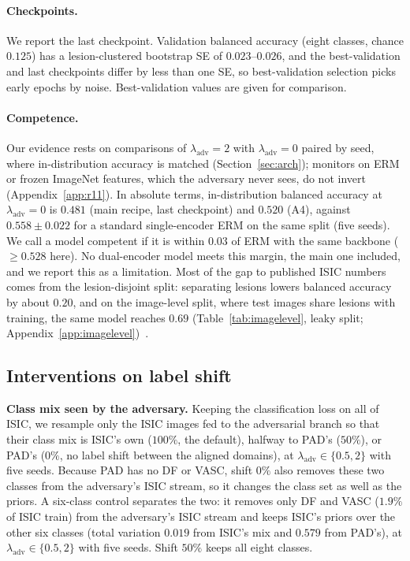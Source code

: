 \documentclass{midl}
\newcommand{\lam}{\lambda_{\mathrm{adv}}}
\begin{document}
\paragraph{Checkpoints.} We report the last checkpoint. Validation balanced accuracy (eight
classes, chance $0.125$) has a lesion-clustered bootstrap SE of $0.023$--$0.026$, and the
best-validation and last checkpoints differ by less than one SE, so best-validation selection
picks early epochs by noise. Best-validation values are given for comparison.

\paragraph{Competence.} Our evidence rests on comparisons of $\lam=2$ with $\lam=0$ paired by seed, where
in-distribution accuracy is matched (Section~\ref{sec:arch}); monitors on ERM or frozen ImageNet features, which
the adversary never sees, do not invert (Appendix~\ref{app:r11}). In absolute terms, in-distribution balanced
accuracy at $\lam=0$ is $0.481$ (main recipe, last checkpoint) and $0.520$ (A4), against $0.558\pm0.022$ for a
standard single-encoder ERM on the same split (five seeds). We call a model competent if it is within $0.03$ of
ERM with the same backbone ($\ge0.528$ here). No dual-encoder model meets this margin, the main one included,
and we report this as a limitation. Most of the gap to published ISIC numbers comes from the
lesion-disjoint split: separating lesions lowers balanced accuracy by about $0.20$, and on the
image-level split, where test images share lesions with training, the same model reaches
$0.69$ (Table~\ref{tab:imagelevel}, leaky split; Appendix~\ref{app:imagelevel})~\cite{leakagepaper}.

\subsection{Interventions on label shift}
\label{sec:interventions}

\textbf{Class mix seen by the adversary.} Keeping the classification loss on all of ISIC,
we resample only the ISIC images fed to the adversarial branch so that their class mix is
ISIC's own ($100\%$, the default), halfway to PAD's ($50\%$), or PAD's ($0\%$, no label
shift between the aligned domains), at $\lam\in\{0.5,2\}$ with five seeds.
Because PAD has no DF or VASC, shift $0\%$ also removes these two classes from the adversary's
ISIC stream, so it changes the class set as well as the priors. A six-class control separates the two:
it removes only DF and VASC ($1.9\%$ of ISIC train) from the adversary's ISIC stream and keeps ISIC's
priors over the other six classes (total variation $0.019$ from ISIC's mix and $0.579$ from PAD's), at
$\lam\in\{0.5,2\}$ with five seeds. Shift $50\%$ keeps all eight classes.
\end{document}
